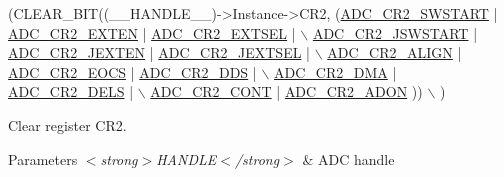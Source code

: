 \begin{DoxyCode}
(CLEAR\_BIT((\_\_HANDLE\_\_)->Instance->CR2, (\hyperlink{group___peripheral___registers___bits___definition_ga5eae65bad1a6c975e1911eb5ba117468}{ADC\_CR2\_SWSTART}  | 
      \hyperlink{group___peripheral___registers___bits___definition_ga574b4d8e90655d0432882d620e629234}{ADC\_CR2\_EXTEN}  | \hyperlink{group___peripheral___registers___bits___definition_ga6d1054d6cd017e305cf6e8a864ce96c8}{ADC\_CR2\_EXTSEL}  |   \(\backslash\)
                                           \hyperlink{group___peripheral___registers___bits___definition_gac12fe8a6cc24eef2ed2e1f1525855678}{ADC\_CR2\_JSWSTART} | 
      \hyperlink{group___peripheral___registers___bits___definition_ga07330f702208792faca3a563dc4fd9c6}{ADC\_CR2\_JEXTEN} | \hyperlink{group___peripheral___registers___bits___definition_gaab3aa5d0e2a4b77960ec8f3b425a3eac}{ADC\_CR2\_JEXTSEL} |   \(\backslash\)
                                           \hyperlink{group___peripheral___registers___bits___definition_gaf5950b5a7438a447584f6dd86c343362}{ADC\_CR2\_ALIGN}    | 
      \hyperlink{group___peripheral___registers___bits___definition_gaf9dac2004ab20295e04012060ab24aeb}{ADC\_CR2\_EOCS}   | \hyperlink{group___peripheral___registers___bits___definition_ga0d7d75f0c4c8fa190fbf9f86fbe6dfc8}{ADC\_CR2\_DDS}     |   \(\backslash\)
                                           \hyperlink{group___peripheral___registers___bits___definition_ga017309ac4b532bc8c607388f4e2cbbec}{ADC\_CR2\_DMA}      | 
      \hyperlink{group___peripheral___registers___bits___definition_ga70d08cda9c1473839b560b33ff6fd672}{ADC\_CR2\_DELS}   |                     \(\backslash\)
                                           \hyperlink{group___peripheral___registers___bits___definition_ga49bb71a868c9d88a0f7bbe48918b2140}{ADC\_CR2\_CONT}     | 
      \hyperlink{group___peripheral___registers___bits___definition_ga89b646f092b052d8488d2016f6290f0e}{ADC\_CR2\_ADON}                      )) \(\backslash\)
  )
\end{DoxyCode}


Clear register C\-R2. 


\begin{DoxyParams}{Parameters}
{\em $<$strong$>$\-H\-A\-N\-D\-L\-E$<$/strong$>$} & A\-D\-C handle \\
\hline
\end{DoxyParams}

